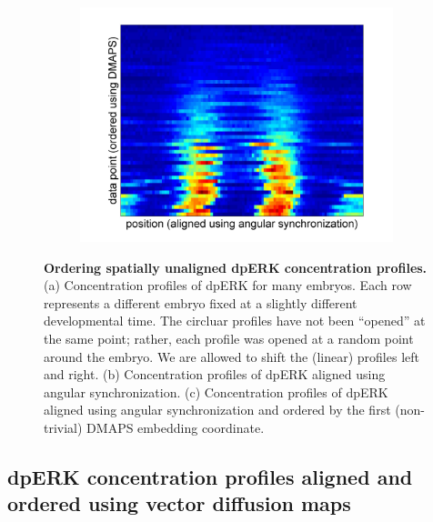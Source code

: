 \documentclass[10pt]{article}
\begin{document}
\begin{figure}[H]
\begin{subfigure}{0.3\textwidth}
\includegraphics[width=\textwidth]{data_ordered_angsynch}
\caption{}
\end{subfigure}
\caption{{\bf Ordering spatially unaligned dpERK concentration profiles.} (a) Concentration profiles of dpERK for many embryos. Each row represents a different embryo fixed at a slightly different developmental time. The circluar profiles have not been ``opened'' at the same point; rather, each profile was opened at a random point around the embryo. We are allowed to shift the (linear) profiles left and right.
(b) Concentration profiles of dpERK aligned using angular synchronization.
(c) Concentration profiles of dpERK aligned using angular synchronization and ordered by the first (non-trivial) DMAPS embedding coordinate.}
\label{fig:angsynch_ordering}
\end{figure}

\subsection*{dpERK concentration profiles aligned and ordered using vector diffusion maps}
\end{document}
